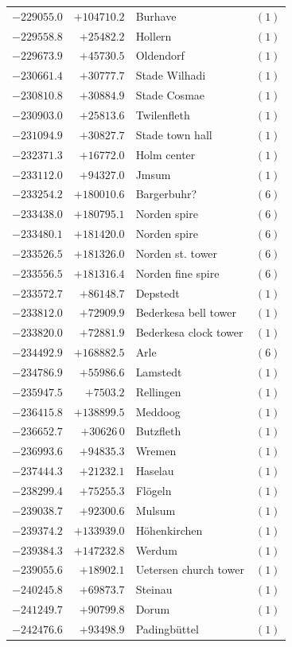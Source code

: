 \begin{center}
\begin{tabular}{r|r|p{170pt}|r}
\(-229055.0\)&\(+104710.2\)&Burhave&\((1)\)\\
\(-229558.8\)&\(+25482.2\)&Hollern&\((1)\)\\
\(-229673.9\)&\(+45730.5\)&Oldendorf&\((1)\)\\
\(-230661.4\)&\(+30777.7\)&Stade Wilhadi&\((1)\)\\
\(-230810.8\)&\(+30884.9\)&Stade Cosmae&\((1)\)\\
\(-230903.0\)&\(+25813.6\)&Twilenfleth&\((1)\)\\
\(-231094.9\)&\(+30827.7\)&Stade town hall&\((1)\)\\
\(-232371.3\)&\(+16772.0\)&Holm center&\((1)\)\\
\(-233112.0\)&\(+94327.0\)&Jmsum&\((1)\)\\
\(-233254.2\)&\(+180010.6\)&Bargerbuhr?&\((6)\)\\
\(-233438.0\)&\(+180795.1\)&Norden spire&\((6)\)\\
\(-233480.1\)&\(+181420.0\)&Norden spire&\((6)\)\\
\(-233526.5\)&\(+181326.0\)&Norden st. tower&\((6)\)\\
\(-233556.5\)&\(+181316.4\)&Norden fine spire&\((6)\)\\
\(-233572.7\)&\(+86148.7\)&Depstedt&\((1)\)\\
\(-233812.0\)&\(+72909.9\)&Bederkesa bell tower&\((1)\)\\
\(-233820.0\)&\(+72881.9\)&Bederkesa clock tower&\((1)\)\\
\(-234492.9\)&\(+168882.5\)&Arle&\((6)\)\\
\(-234786.9\)&\(+55986.6\)&Lamstedt&\((1)\)\\
\(-235947.5\)&\(+7503.2\)&Rellingen&\((1)\)\\
\(-236415.8\)&\(+138899.5\)&Meddoog&\((1)\)\\
\(-236652.7\)&\(+30626\,0\)&Butzfleth&\((1)\)\\
\(-236993.6\)&\(+94835.3\)&Wremen&\((1)\)\\
\(-237444.3\)&\(+21232.1\)&Haselau&\((1)\)\\
\(-238299.4\)&\(+75255.3\)&Flögeln&\((1)\)\\
\(-239038.7\)&\(+92300.6\)&Mulsum&\((1)\)\\
\(-239374.2\)&\(+133939.0\)&Höhenkirchen&\((1)\)\\
\(-239384.3\)&\(+147232.8\)&Werdum&\((1)\)\\
\(-239055.6\)&\(+18902.1\)&Uetersen church tower&\((1)\)\\
\(-240245.8\)&\(+69873.7\)&Steinau&\((1)\)\\
\(-241249.7\)&\(+90799.8\)&Dorum&\((1)\)\\
\(-242476.6\)&\(+93498.9\)&Padingbüttel&\((1)\)\\
\hline\end{tabular}\endgroup\end{center}
